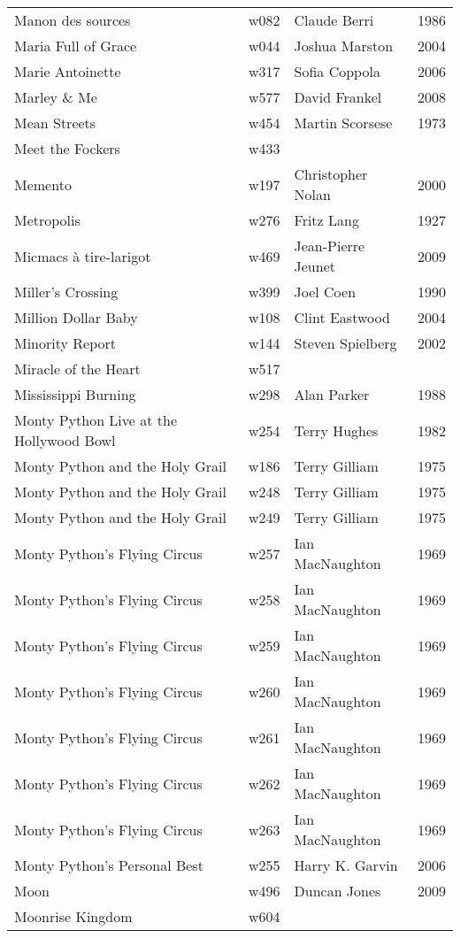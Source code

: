 \documentclass{article}
\begin{document}
\begin {center}
\begin{longtable}{p{10cm} l l l}
Manon des sources & w082 & Claude Berri & 1986 \\
Maria Full of Grace & w044 & Joshua Marston & 2004 \\
Marie Antoinette & w317 & Sofia Coppola & 2006 \\
Marley \& Me & w577 & David Frankel & 2008 \\
Mean Streets & w454 & Martin Scorsese & 1973 \\
Meet the Fockers & w433 &  &  \\
Memento & w197 & Christopher Nolan & 2000 \\
Metropolis & w276 & Fritz Lang & 1927 \\
Micmacs à tire-larigot & w469 & Jean-Pierre Jeunet & 2009 \\
Miller's Crossing & w399 & Joel Coen & 1990 \\
Million Dollar Baby & w108 & Clint Eastwood & 2004 \\
Minority Report & w144 & Steven Spielberg & 2002 \\
Miracle of the Heart & w517 &  &  \\
Mississippi Burning & w298 & Alan Parker & 1988 \\
Monty Python Live at the Hollywood Bowl & w254 & Terry Hughes & 1982 \\
Monty Python and the Holy Grail & w186 & Terry Gilliam & 1975 \\
Monty Python and the Holy Grail & w248 & Terry Gilliam & 1975 \\
Monty Python and the Holy Grail & w249 & Terry Gilliam & 1975 \\
Monty Python's Flying Circus & w257 & Ian MacNaughton & 1969 \\
Monty Python's Flying Circus & w258 & Ian MacNaughton & 1969 \\
Monty Python's Flying Circus & w259 & Ian MacNaughton & 1969 \\
Monty Python's Flying Circus & w260 & Ian MacNaughton & 1969 \\
Monty Python's Flying Circus & w261 & Ian MacNaughton & 1969 \\
Monty Python's Flying Circus & w262 & Ian MacNaughton & 1969 \\
Monty Python's Flying Circus & w263 & Ian MacNaughton & 1969 \\
Monty Python's Personal Best & w255 & Harry K. Garvin & 2006 \\
Moon & w496 & Duncan Jones & 2009 \\
Moonrise Kingdom & w604 &  &  \\

\end{longtable}
\end{center}
\end{document}
